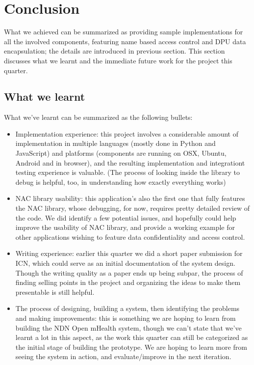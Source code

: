\documentclass[letterpaper,twocolumn,11pt]{article}
\begin{document}
\section{Conclusion}

What we achieved can be summarized as providing sample implementations for all the involved components, featuring name based access control and DPU data encapsulation; the details are introduced in previous section. This section discusses what we learnt and the immediate future work for the project this quarter.

\subsection{What we learnt}

What we've learnt can be summarized as the following bullets:

\begin{itemize}
\item Implementation experience: this project involves a considerable amount of implementation in multiple languages (mostly done in Python and JavaScript) and platforms (components are running on OSX, Ubuntu, Android and in browser), and the resulting implementation and integrationt testing experience is valuable. (The process of looking inside the library to debug is helpful, too, in understanding how exactly everything works)
\item NAC library usability: this application's also the first one that fully features the NAC library, whose debugging, for now, requires pretty detailed review of the code. We did identify a few potential issues, and hopefully could help improve the usability of NAC library, and provide a working example for other applications wishing to feature data confidentiality and access control.
\item Writing experience: earlier this quarter we did a short paper submission for ICN, which could serve as an initial documentation of the system design. Though the writing quality as a paper ends up being subpar, the process of finding selling points in the project and organizing the ideas to make them presentable is still helpful.
\item The process of designing, building a system, then identifying the problems and making improvements: this is something we are hoping to learn from building the NDN Open mHealth system, though we can't state that we've learnt a lot in this aspect, as the work this quarter can still be categorized as the initial stage of building the prototype. We are hoping to learn more from seeing the system in action, and evaluate/improve in the next iteration.
\end{itemize}
\end{document}
